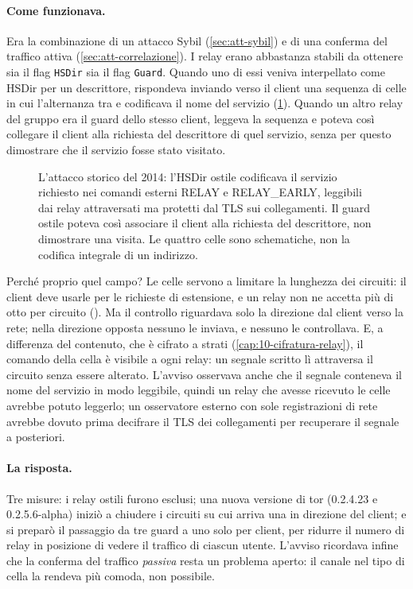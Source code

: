 \paragraph{Come funzionava.} Era la combinazione di un attacco Sybil (\cref{sec:att-sybil}) e di una conferma del traffico attiva (\cref{sec:att-correlazione}). I relay erano abbastanza stabili da ottenere sia il flag \texttt{HSDir} sia il flag \texttt{Guard}. Quando uno di essi veniva interpellato come HSDir per un descrittore, rispondeva inviando verso il client una sequenza di celle in cui l'alternanza tra  e  codificava il nome del servizio (\cref{fig:relayearly}). Quando un altro relay del gruppo era il guard dello stesso client, leggeva la sequenza e poteva così collegare il client alla richiesta del descrittore di quel servizio, senza per questo dimostrare che il servizio fosse stato visitato.

\begin{figure}[htbp]
\centering

\caption{L'attacco storico del 2014: l'HSDir ostile codificava il servizio richiesto nei comandi esterni RELAY e RELAY\_EARLY, leggibili dai relay attraversati ma protetti dal TLS sui collegamenti. Il guard ostile poteva così associare il client alla richiesta del descrittore, non dimostrare una visita. Le quattro celle sono schematiche, non la codifica integrale di un indirizzo.}
\label{fig:relayearly}
\end{figure}

Perché proprio quel campo? Le celle  servono a limitare la lunghezza dei circuiti: il client deve usarle per le richieste di estensione, e un relay non ne accetta più di otto per circuito (). Ma il controllo riguardava solo la direzione dal client verso la rete; nella direzione opposta nessuno le inviava, e nessuno le controllava. E, a differenza del contenuto, che è cifrato a strati (\cref{cap:10-cifratura-relay}), il comando della cella è visibile a ogni relay: un segnale scritto lì attraversa il circuito senza essere alterato. L'avviso osservava anche che il segnale conteneva il nome del servizio in modo leggibile, quindi un relay che avesse ricevuto le celle avrebbe potuto leggerlo; un osservatore esterno con sole registrazioni di rete avrebbe dovuto prima decifrare il TLS dei collegamenti per recuperare il segnale a posteriori.

\paragraph{La risposta.} Tre misure: i relay ostili furono esclusi; una nuova versione di tor (0.2.4.23 e 0.2.5.6-alpha) iniziò a chiudere i circuiti su cui arriva una  in direzione del client; e si preparò il passaggio da tre guard a uno solo per client, per ridurre il numero di relay in posizione di vedere il traffico di ciascun utente. L'avviso ricordava infine che la conferma del traffico \emph{passiva} resta un problema aperto: il canale nel tipo di cella la rendeva più comoda, non possibile.


